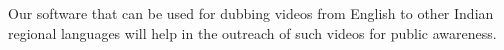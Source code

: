 \documentclass[preview]{standalone}
\begin{document}
\begin{flushleft}
\fontsize{15}{0}\selectfont Our software that can be used for dubbing videos from English to other Indian regional languages will help in the outreach of such videos for public awareness.
\end{flushleft}
\end{document}
